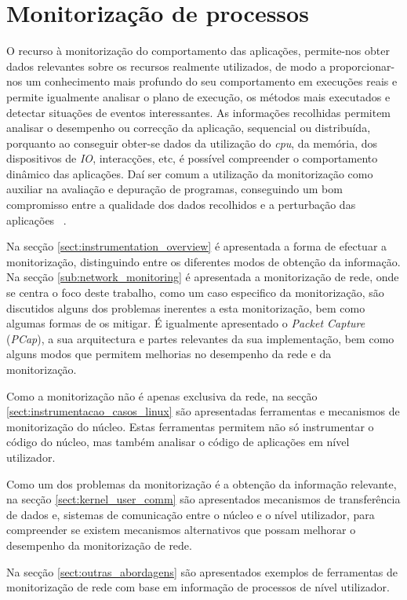 \chapter{Monitorização de processos}
\label{cap:trabrelacionado}
O recurso à monitorização do comportamento das aplicações, permite-nos obter dados relevantes sobre os recursos realmente utilizados, de modo a proporcionar-nos um conhecimento mais profundo do seu comportamento em execuções reais e permite igualmente analisar o plano de execução, os métodos mais executados e detectar situações de eventos interessantes.
As informações recolhidas permitem analisar o desempenho ou correcção da aplicação, sequencial ou distribuída, porquanto ao conseguir obter-se dados da utilização do \textit{cpu}, da memória, dos dispositivos de \textit{IO}, interacções, etc, é possível compreender o comportamento dinâmico das aplicações.
Daí ser comum a utilização da monitorização como auxiliar na avaliação e depuração de programas, conseguindo um bom compromisso entre a qualidade dos dados recolhidos e a perturbação das aplicações ~\cite{DuartePhd05}.
 
Na secção \ref{sect:instrumentation_overview} é apresentada a forma de efectuar a monitorização, distinguindo entre os diferentes modos de obtenção da informação.
Na secção \ref{sub:network_monitoring} é apresentada a monitorização de rede, onde se centra o foco deste trabalho, como um caso especifico da monitorização, são discutidos alguns dos problemas inerentes a esta monitorização, bem como algumas formas de os mitigar.
É igualmente apresentado o \textit{Packet Capture} (\textit{PCap}), a sua arquitectura e partes relevantes da sua implementação, bem como alguns modos que permitem melhorias no desempenho da rede e da monitorização.

Como a monitorização não é apenas exclusiva da rede, na secção \ref{sect:instrumentacao_casos_linux} são apresentadas ferramentas e mecanismos de monitorização do núcleo.
Estas ferramentas permitem não só instrumentar o código do núcleo, mas também analisar o código de aplicações em nível utilizador.

Como um dos problemas da monitorização é a obtenção da informação relevante, na secção \ref{sect:kernel_user_comm} são apresentados mecanismos de transferência de dados e, sistemas de comunicação entre o núcleo e o nível utilizador, para compreender se existem mecanismos alternativos que possam melhorar o desempenho da monitorização de rede.

Na secção \ref{sect:outras_abordagens} são apresentados exemplos de ferramentas de monitorização de rede com base em informação de processos de nível utilizador.

